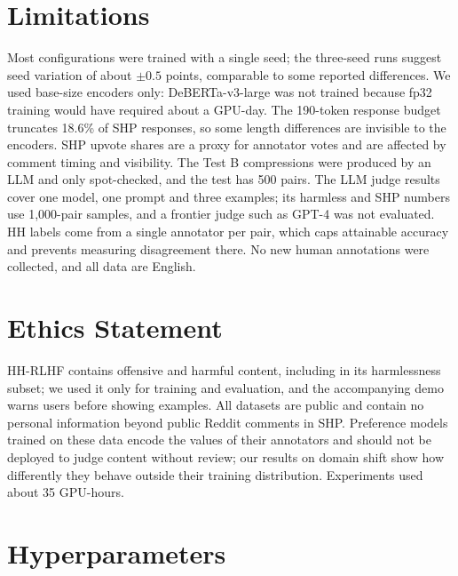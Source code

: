 \documentclass[11pt]{article}
\begin{document}
\section*{Limitations}

Most configurations were trained with a single seed; the three-seed runs suggest seed variation of about $\pm0.5$ points, comparable to some reported differences. We used base-size encoders only: DeBERTa-v3-large was not trained because fp32 training would have required about a GPU-day. The 190-token response budget truncates 18.6\% of SHP responses, so some length differences are invisible to the encoders. SHP upvote shares are a proxy for annotator votes and are affected by comment timing and visibility. The Test B compressions were produced by an LLM and only spot-checked, and the test has 500 pairs. The LLM judge results cover one model, one prompt and three examples; its harmless and SHP numbers use 1,000-pair samples, and a frontier judge such as GPT-4 was not evaluated. HH labels come from a single annotator per pair, which caps attainable accuracy and prevents measuring disagreement there. No new human annotations were collected, and all data are English.

\section*{Ethics Statement}

HH-RLHF contains offensive and harmful content, including in its harmlessness subset; we used it only for training and evaluation, and the accompanying demo warns users before showing examples. All datasets are public and contain no personal information beyond public Reddit comments in SHP. Preference models trained on these data encode the values of their annotators and should not be deployed to judge content without review; our results on domain shift show how differently they behave outside their training distribution. Experiments used about 35 GPU-hours.



\appendix

\section{Hyperparameters}
\label{app:hparams}
\end{document}

